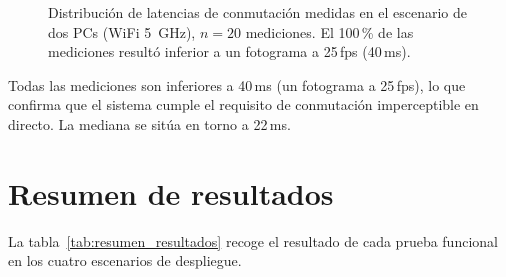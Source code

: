 \begin{figure}[H]
  \centering
  \caption{Distribución de latencias de conmutación medidas en el escenario
           de dos PCs (WiFi 5~GHz), $n=20$ mediciones. El 100\,\% de las
           mediciones resultó inferior a un fotograma a 25\,fps (40\,ms).}
  \label{fig:latencia}
\end{figure}

Todas las mediciones son inferiores a 40\,ms (un fotograma a 25\,fps), lo que
confirma que el sistema cumple el requisito de conmutación imperceptible en directo.
La mediana se sitúa en torno a 22\,ms.

\section{Resumen de resultados}
\label{sec:resultados}

La tabla~\ref{tab:resumen_resultados} recoge el resultado de cada prueba funcional
en los cuatro escenarios de despliegue.

